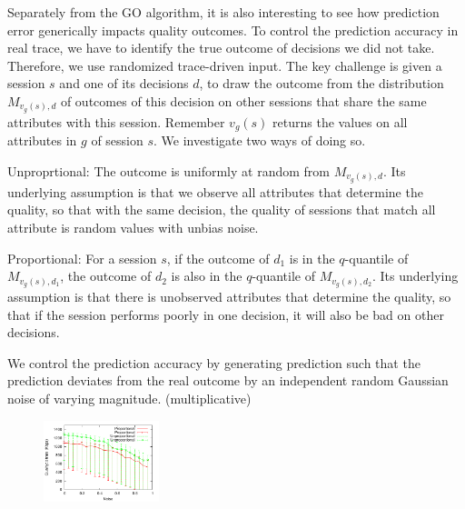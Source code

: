 
Separately from the GO algorithm, it is also interesting to see how prediction error generically impacts quality outcomes.  To control the prediction accuracy in real trace, we have to identify the true outcome of decisions we did not take. Therefore, we use randomized trace-driven input. The key challenge is given a session $s$ and one of its decisions $d$, to draw the outcome from the distribution $M_{v_g(s),d}$ of outcomes of this decision on other sessions that share the same attributes with this session. Remember $v_g(s)$ returns the values on all attributes in $g$ of session $s$. We investigate two ways of doing so. 
\begin{packedenumerate}
	\item Unproprtional: The outcome is uniformly at random from $M_{v_g(s),d}$. Its underlying assumption is that we observe all attributes that determine the quality, so that with the same decision, the quality of sessions that match all attribute is random values with unbias noise.
	\item Proportional: For a session $s$, if the outcome of $d_1$ is in the $q$-quantile of $M_{v_g(s),d_1}$, the outcome of $d_2$ is also in the $q$-quantile of $M_{v_g(s),d_2}$. Its underlying assumption is that there is unobserved attributes that determine the quality, so that if the session performs poorly in one decision, it will also be bad on other decisions.
\end{packedenumerate}

We control the prediction accuracy by generating prediction such that the prediction deviates from the real outcome by an independent random Gaussian noise of varying magnitude. (multiplicative)

\begin{figure}[h!]
\centering
 \includegraphics[width=0.3\textwidth] {figures/impact/result-noise-impact.pdf}
\label{fig:cdn-degradation}
\end{figure}

